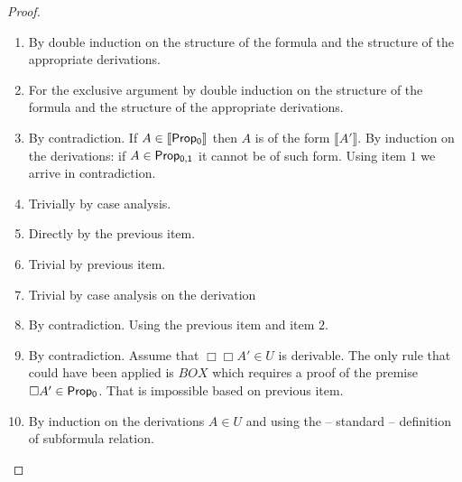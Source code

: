 \begin{proof}

\begin{enumerate}
\item By double induction on the structure of the formula and the structure of the appropriate derivations.
\item For the exclusive argument by double induction on the structure of the formula and the structure of the appropriate derivations.
\item By contradiction. If $A\in \llbracket{\sf Prop_0} \rrbracket$ then $A$ is of the form $\llbracket A' \rrbracket$. By induction on the derivations: if $A\in {\sf Prop_{0,1}}$ it cannot be of such form. Using item $1$ we arrive in contradiction.
\item Trivially by case analysis.
\item Directly by the previous item.
\item Trivial by previous item.
\item Trivial by case analysis on the derivation
\item By contradiction. Using the previous item and item $2$.
\item By contradiction. Assume that $\Box\Box A' \in U$ is derivable. The only rule that could have been applied is {\sf $BOX$} which requires a proof of the premise $\Box A'\in {\sf Prop_0}$. That is impossible based on previous item.
\item By induction on the derivations $A\in U$ and using the -- standard -- definition of subformula relation.
\end{enumerate}
\end{proof}
